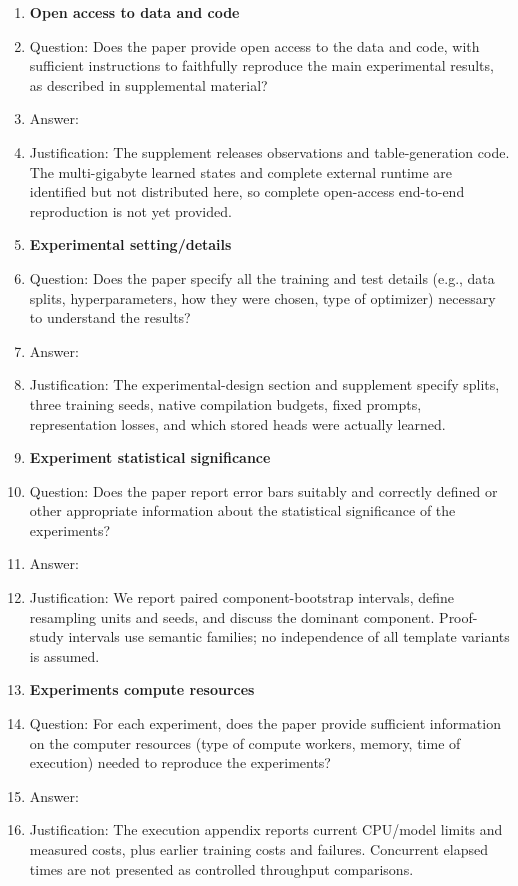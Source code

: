 \begin{enumerate}
\item {\bf Open access to data and code}
    \item[] Question: Does the paper provide open access to the data and code, with sufficient instructions to faithfully reproduce the main experimental results, as described in supplemental material?
    \item[] Answer: \answerNo{}
    \item[] Justification: The supplement releases observations and table-generation code. The multi-gigabyte learned states and complete external runtime are identified but not distributed here, so complete open-access end-to-end reproduction is not yet provided.


\item {\bf Experimental setting/details}
    \item[] Question: Does the paper specify all the training and test details (e.g., data splits, hyperparameters, how they were chosen, type of optimizer) necessary to understand the results?
    \item[] Answer: \answerYes{}
    \item[] Justification: The experimental-design section and supplement specify splits, three training seeds, native compilation budgets, fixed prompts, representation losses, and which stored heads were actually learned.

\item {\bf Experiment statistical significance}
    \item[] Question: Does the paper report error bars suitably and correctly defined or other appropriate information about the statistical significance of the experiments?
    \item[] Answer: \answerYes{}
    \item[] Justification: We report paired component-bootstrap intervals, define resampling units and seeds, and discuss the dominant component. Proof-study intervals use semantic families; no independence of all template variants is assumed.

\item {\bf Experiments compute resources}
    \item[] Question: For each experiment, does the paper provide sufficient information on the computer resources (type of compute workers, memory, time of execution) needed to reproduce the experiments?
    \item[] Answer: \answerYes{}
    \item[] Justification: The execution appendix reports current CPU/model limits and measured costs, plus earlier training costs and failures. Concurrent elapsed times are not presented as controlled throughput comparisons.
    

\end{enumerate}
